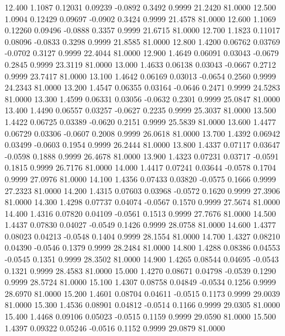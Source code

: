   12.400   1.1087   0.12031   0.09239  -0.0892   0.3492   0.9999  21.2420  81.0000
  12.500   1.0904   0.12429   0.09697  -0.0902   0.3424   0.9999  21.4578  81.0000
  12.600   1.1069   0.12260   0.09496  -0.0888   0.3357   0.9999  21.6715  81.0000
  12.700   1.1823   0.11017   0.08096  -0.0833   0.3298   0.9999  21.8585  81.0000
  12.800   1.4200   0.06762   0.03769  -0.0702   0.3127   0.9999  22.4044  81.0000
  12.900   1.4649   0.06091   0.03043  -0.0679   0.2845   0.9999  23.3119  81.0000
  13.000   1.4633   0.06138   0.03043  -0.0667   0.2712   0.9999  23.7417  81.0000
  13.100   1.4642   0.06169   0.03013  -0.0654   0.2560   0.9999  24.2343  81.0000
  13.200   1.4547   0.06355   0.03164  -0.0646   0.2471   0.9999  24.5283  81.0000
  13.300   1.4599   0.06331   0.03056  -0.0632   0.2301   0.9999  25.0847  81.0000
  13.400   1.4490   0.06557   0.03257  -0.0627   0.2235   0.9999  25.3037  81.0000
  13.500   1.4422   0.06725   0.03389  -0.0620   0.2151   0.9999  25.5839  81.0000
  13.600   1.4477   0.06729   0.03306  -0.0607   0.2008   0.9999  26.0618  81.0000
  13.700   1.4392   0.06942   0.03499  -0.0603   0.1954   0.9999  26.2444  81.0000
  13.800   1.4337   0.07117   0.03647  -0.0598   0.1888   0.9999  26.4678  81.0000
  13.900   1.4323   0.07231   0.03717  -0.0591   0.1815   0.9999  26.7176  81.0000
  14.000   1.4417   0.07241   0.03644  -0.0578   0.1704   0.9999  27.0976  81.0000
  14.100   1.4356   0.07433   0.03820  -0.0575   0.1666   0.9999  27.2323  81.0000
  14.200   1.4315   0.07603   0.03968  -0.0572   0.1620   0.9999  27.3906  81.0000
  14.300   1.4298   0.07737   0.04074  -0.0567   0.1570   0.9999  27.5674  81.0000
  14.400   1.4316   0.07820   0.04109  -0.0561   0.1513   0.9999  27.7676  81.0000
  14.500   1.4437   0.07830   0.04027  -0.0549   0.1426   0.9999  28.0758  81.0000
  14.600   1.4377   0.08023   0.04213  -0.0548   0.1404   0.9999  28.1554  81.0000
  14.700   1.4327   0.08210   0.04390  -0.0546   0.1379   0.9999  28.2484  81.0000
  14.800   1.4288   0.08386   0.04553  -0.0545   0.1351   0.9999  28.3502  81.0000
  14.900   1.4265   0.08544   0.04695  -0.0543   0.1321   0.9999  28.4583  81.0000
  15.000   1.4270   0.08671   0.04798  -0.0539   0.1290   0.9999  28.5724  81.0000
  15.100   1.4307   0.08758   0.04849  -0.0534   0.1256   0.9999  28.6970  81.0000
  15.200   1.4601   0.08704   0.04611  -0.0515   0.1173   0.9999  29.0039  81.0000
  15.300   1.4536   0.08901   0.04812  -0.0514   0.1166   0.9999  29.0305  81.0000
  15.400   1.4468   0.09106   0.05023  -0.0515   0.1159   0.9999  29.0590  81.0000
  15.500   1.4397   0.09322   0.05246  -0.0516   0.1152   0.9999  29.0879  81.0000
